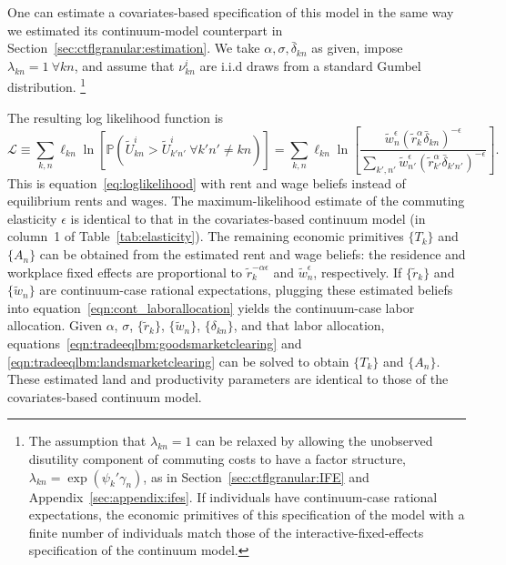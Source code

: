 \documentclass[11pt]{article}
\theoremstyle{definition}
\begin{document}
One can estimate a covariates-based specification of this model
in the same way we estimated its continuum-model counterpart in Section~\ref{sec:ctflgranular:estimation}.
We take $\alpha,\sigma,\bar{\delta}_{kn}$ as given,
impose $\lambda_{kn} = 1 \ \forall kn$,
and
assume that $\nu_{kn}^{i}$ are i.i.d draws from a standard Gumbel distribution.%
\footnote{
	The assumption that $\lambda_{kn} = 1$ can be relaxed by allowing
	the unobserved disutility component of commuting costs to have a factor structure, $\lambda_{kn} = \exp(\psi_k'\gamma_n)$,
	as in Section~\ref{sec:ctflgranular:IFE} and Appendix~\ref{sec:appendix:ifes}.
	If individuals have continuum-case rational expectations,
	the economic primitives of this specification of the model with a finite number of individuals
	match those of the interactive-fixed-effects specification of the continuum model.
}

The resulting log likelihood function is
\begin{equation}\label{eq:gran_loglikelihood}
\mathcal{L}
\equiv
\sum_{k,n} \ell_{kn} \ln \left[\mathbb{P}(\tilde{U}_{kn}^{i} > \tilde{U}_{k'n'}^{i} \ \forall k'n' \neq kn)\right]
=
\sum_{k,n} \ell_{kn} \ln \left[
\frac
{\tilde{w}_{n}^\epsilon \left(\tilde{r}_{k}^\alpha  \bar{\delta}_{kn}\right)^{-\epsilon}}
{\sum_{k',n'} \tilde{w}_{n'}^\epsilon \left(\tilde{r}_{k'}^\alpha  \bar{\delta}_{k'n'}\right)^{-\epsilon}}
\right]
.\end{equation}
This is equation~\eqref{eq:loglikelihood}
with rent and wage beliefs instead of equilibrium rents and wages.
The maximum-likelihood estimate of the commuting elasticity $\epsilon$ is identical to that in the covariates-based continuum model (in column~1 of Table~\ref{tab:elasticity}).
The remaining economic primitives $\{{T}_{k}\}$ and $\{{A}_{n}\}$ can be obtained from the estimated rent and wage beliefs:
the residence and workplace fixed effects are proportional to $\tilde{r}_{k}^{-\alpha\epsilon}$ and $\tilde{w}_{n}^{\epsilon}$, respectively.
If $\{\tilde{r}_{k}\}$ and $\{\tilde{w}_{n}\}$ are continuum-case rational expectations,
plugging these estimated beliefs
into equation~\eqref{eqn:cont_laborallocation} yields the continuum-case labor allocation.
Given $\alpha$, $\sigma$, $\{\tilde{r}_{k}\}$, $\{\tilde{w}_{n}\}$, $\{\delta_{kn}\}$, and that labor allocation,
equations~\eqref{eqn:tradeeqlbm:goodsmarketclearing} and \eqref{eqn:tradeeqlbm:landsmarketclearing}
can be solved to obtain $\{{T}_{k}\}$ and $\{{A}_{n}\}$.
These estimated land and productivity parameters are identical to those of the covariates-based continuum model.
\end{document}
